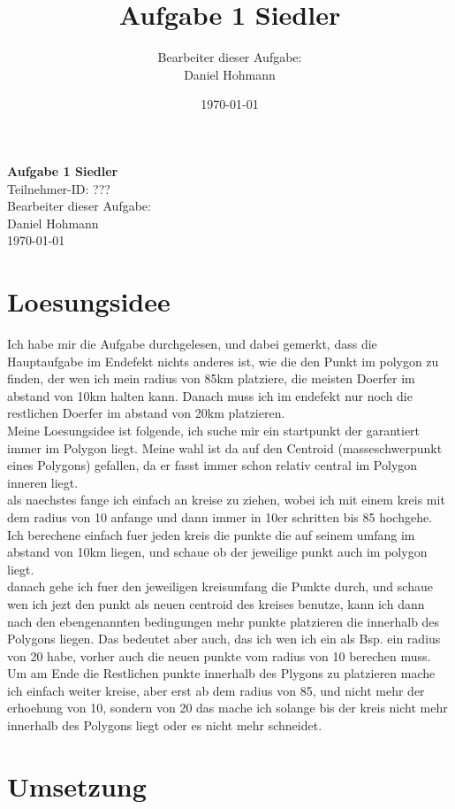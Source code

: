 \documentclass{article}
\title{\Huge{\textbf{Aufgabe 1 Siedler}} \\ \centering{\LARGE{Teilnahme-ID: ?????}}}
\author{Bearbeiter dieser Aufgabe: \\ Daniel Hohmann}
\date{\today}
\begin{document}
\thispagestyle{empty}
\begin{center}
\Huge{\textbf{Aufgabe 1 Siedler}}
\\
\LARGE{Teilnehmer-ID: ???}
\\
\LARGE{Bearbeiter dieser Aufgabe: \\ Daniel Hohmann}
\\
\LARGE{\today}
\end{center}
\newpage
\setcounter{page}{1}
\tableofcontents
\newpage
\section{Loesungsidee}
\begin{center}
Ich habe mir die Aufgabe durchgelesen, und dabei gemerkt, dass die Hauptaufgabe im Endefekt nichts anderes ist, wie die den Punkt im polygon zu finden, der wen ich mein radius von 85km platziere, die meisten Doerfer im abstand von 10km halten kann. Danach muss ich im endefekt nur noch die restlichen Doerfer im abstand von 20km platzieren.
\\
 Meine Loesungsidee ist folgende, ich suche mir ein startpunkt der garantiert immer im Polygon liegt. Meine wahl ist da auf den Centroid (masseschwerpunkt eines Polygons) gefallen, da er fasst immer schon relativ central im Polygon inneren liegt.
 \\
als naechstes fange ich einfach an kreise zu ziehen, wobei ich mit einem kreis mit dem radius von 10 anfange und dann immer in 10er schritten bis 85 hochgehe. Ich berechene einfach fuer jeden kreis die punkte die auf seinem umfang im abstand von 10km liegen, und schaue ob der jeweilige punkt auch im polygon liegt.
\\
 danach gehe ich fuer den jeweiligen kreisumfang die Punkte durch, und schaue wen ich jezt den punkt als neuen centroid des kreises benutze, kann ich dann nach den ebengenannten bedingungen mehr punkte platzieren die innerhalb des Polygons liegen. Das bedeutet aber auch, das ich wen ich ein als Bsp. ein radius von 20 habe, vorher auch die neuen punkte vom radius von 10 berechen muss.
\\ 
  Um am Ende die Restlichen punkte innerhalb des Plygons zu platzieren mache ich einfach weiter kreise, aber erst ab dem radius von 85, und nicht mehr der erhoehung von 10, sondern von 20 das mache ich solange bis der kreis nicht mehr innerhalb des Polygons liegt oder es nicht mehr schneidet.
\end{center}
\section{Umsetzung}
\end{document}
